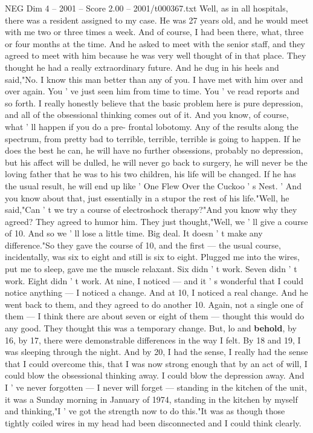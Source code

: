 \begin{textsample}{NEG Dim 4 – 2001 – Score 2.00 – 2001/t000367.txt}
Well, as in all hospitals, there was a resident assigned to my case.
He was 27 years old, and he would meet with me two or three times a week.
And of course, I had been there, what, three or four months at the time.
And he asked to meet with the senior staff, and they agreed to meet with him because he was very well thought of in that place.
They thought he had a really extraordinary future.
And he dug in his heels and said,"No.
I know this man better than any of you.
I have met with him over and over again.
You ' ve just seen him from time to time.
You ' ve read reports and so forth.
I really honestly believe that the basic problem here is pure depression, and all of the obsessional thinking comes out of it.
And you know, of course, what ' ll happen if you do a pre- frontal lobotomy.
Any of the results along the spectrum, from pretty bad to terrible, terrible, terrible is going to happen.
If he does the best he can, he will have no further obsessions, probably no depression, but his affect will be dulled, he will never go back to surgery, he will never be the loving father that he was to his two children, his life will be changed.
If he has the usual result, he will end up like ' One Flew Over the Cuckoo ' s Nest. ' And you know about that, just essentially in a stupor the rest of his life."Well, he said,"Can ' t we try a course of electroshock therapy?"And you know why they agreed?
They agreed to humor him.
They just thought,"Well, we ' ll give a course of 10.
And so we ' ll lose a little time.
Big deal.
It doesn ' t make any difference."So they gave the course of 10, and the first — the usual course, incidentally, was six to eight and still is six to eight.
Plugged me into the wires, put me to sleep, gave me the muscle relaxant.
Six didn ' t work.
Seven didn ' t work.
Eight didn ' t work.
At nine, I noticed — and it ' s wonderful that I could notice anything — I noticed a change.
And at 10, I noticed a real change.
And he went back to them, and they agreed to do another 10.
Again, not a single one of them — I think there are about seven or eight of them — thought this would do any good.
They thought this was a temporary change.
But, lo and \textbf{behold}, by 16, by 17, there were demonstrable differences in the way I felt.
By 18 and 19, I was sleeping through the night.
And by 20, I had the sense, I really had the sense that I could overcome this, that I was now strong enough that by an act of will, I could blow the obsessional thinking away.
I could blow the depression away.
And I ' ve never forgotten — I never will forget — standing in the kitchen of the unit, it was a Sunday morning in January of 1974, standing in the kitchen by myself and thinking,"I ' ve got the strength now to do this."It was as though those tightly coiled wires in my head had been disconnected and I could think clearly.

\end{textsample}
